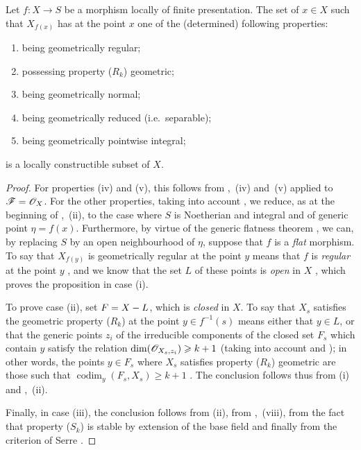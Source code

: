\begin{proposition}[9.9.4]
\label{IV.9.9.4}
Let $f:X\to S$ be a morphism locally of finite presentation.
The set of $x\in X$ such that $X_{f(x)}$ has at the point $x$ one of the (determined) following properties:
\begin{enumerate}[label=\textup{(\roman*)}]
  \item being geometrically regular;
  \item possessing property ($R_k$) geometric;
  \item being geometrically normal;
  \item being geometrically reduced \textup{(i.e.}\ separable\textup{)};
  \item being geometrically pointwise integral;
\end{enumerate}
is a locally constructible subset of $X$.
\end{proposition}

\begin{proof}
\label{IV.9.9.4-proof}
For properties (iv) and (v), this follows from ,~(iv) and~(v) applied to $\mathscr{F}=\mathscr{O}_X$.
For the other properties, taking into account , we reduce, as at the beginning of ,~(ii), to the case where $S$ is Noetherian and integral and of generic point $\eta=f(x)$.
Furthermore, by virtue of the generic flatness theorem , we can, by replacing $S$ by an open neighbourhood of $\eta$, suppose that $f$ is a \emph{flat} morphism.
To say that $X_{f(y)}$ is geometrically regular at the point $y$ means that $f$ is \emph{regular} at the point $y$ , and we know that the set $L$ of these points is \emph{open} in $X$ , which proves the proposition in case (i).

To prove case (ii), set $F=X- L$, which is \emph{closed} in $X$.
To say that $X_s$
satisfies the geometric property ($R_k$) at the point $y\in f^{-1}(s)$ means either that $y\in L$, or that the generic points $z_i$ of the irreducible components of the closed set $F_s$ which contain $y$ satisfy the relation $\dim(\mathscr{O}_{X_s,z_i})\geqslant k+1$ (taking into account  and ); in other words, the points $y\in F_s$ where $X_s$ satisfies property ($R_k$) geometric are those such that $\operatorname{codim}_y(F_s,X_s)\geqslant k+1$ .
The conclusion follows thus from (i) and ,~(ii).

Finally, in case (iii), the conclusion follows from (ii), from ,~(viii), from the fact that property ($S_k$) is stable by extension of the base field  and finally from the criterion of Serre .
\end{proof}

